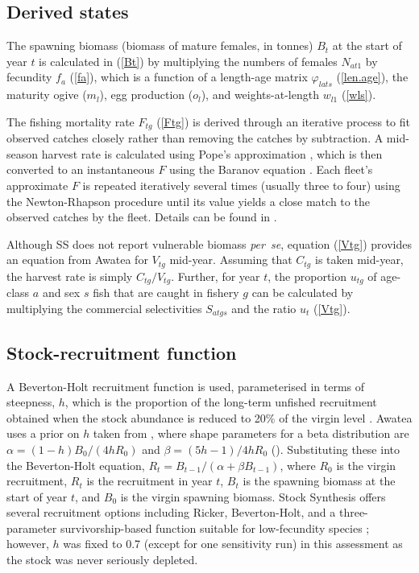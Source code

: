 \documentclass[11pt]{book}
\newcommand{\pc}{\%}
\newcommand{\eref}[1]{(\ref{#1})}
\begin{document}
\subsection{Derived states}

The spawning biomass (biomass of mature females, in tonnes) $B_t$ at the start of year $t$ is calculated in \eref{Bt} by multiplying the numbers of females $N_{at1}$ by fecundity $f_a$ \eref{fa}, which is a function of a length-age matrix $\varphi_{lats}$ \eref{len.age}, the maturity ogive ($m_l$), egg production ($o_l$), and weights-at-length $w_{l1}$ \eref{wls}.

The fishing mortality rate $F_{tg}$ \eref{Ftg} is derived through an iterative process to fit observed catches closely rather than removing the catches by subtraction.
A mid-season harvest rate is calculated using Pope's approximation \citep{Pope:1972}, which is then converted to an instantaneous $F$ using the Baranov equation \citep{Baranov:1918}.
Each fleet's approximate $F$ is repeated iteratively several times (usually three to four) using the Newton-Rhapson procedure until its value yields a close match to the observed catches by the fleet.
Details can be found in \citet{Methot-Wetzel:2013}.

Although SS does not report vulnerable biomass \textit{per~se}, equation \eref{Vtg} provides an equation from Awatea for $V_{tg}$ mid-year.
Assuming that $C_{tg}$ is taken mid-year, the harvest rate is simply $C_{tg} / V_{tg}$.
Further, for year $t$, the proportion $u_{tg}$ of age-class $a$ and sex $s$ fish that are caught in fishery $g$ can be calculated by multiplying the commercial selectivities $S_{atgs}$ and the ratio $u_t$ \eref{Vtg}.

\subsection{Stock-recruitment function}

A Beverton-Holt recruitment function is used, parameterised in terms of steepness, $h$, which is the proportion of the long-term unfished recruitment obtained when the stock abundance is reduced to 20\pc{} of the virgin level \citep{Mace-Doonan:1988, Michielsens-McAllister:2004}.
Awatea uses a prior on $h$ taken from \citet{Forrest-etal:2010}, where shape parameters for a beta distribution are $\alpha = (1 - h) B_0 / (4 h R_0)$ and $\beta = (5 h - 1) / 4 h R_0$ (\citealt{Hilborn-etal:2003, Michielsens-McAllister:2004}). 
Substituting these into the Beverton-Holt equation, $R_t = B_{t-1} / (\alpha + \beta B_{t-1})$, where $R_0$ is the virgin recruitment, $R_t$ is the recruitment in year $t$, $B_t$ is the spawning biomass at the start of year $t$, and $B_0$ is the virgin spawning biomass.
Stock Synthesis offers several recruitment options including Ricker, Beverton-Holt, and a three-parameter survivorship-based function suitable for low-fecundity species \citep{Taylor-etal:2013}; however, $h$ was fixed to 0.7 (except for one sensitivity run) in this assessment as the stock was never seriously depleted.
\end{document}
